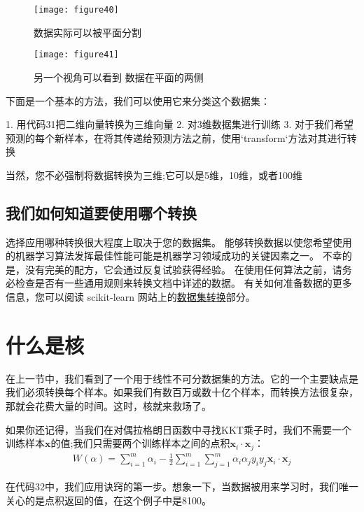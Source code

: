 \begin{figure}[ht]
	\centering
	\texttt{[image: figure40]}
	\caption{数据实际可以被平面分割}
	\label{figure40}
\end{figure}

\begin{figure}[ht]
	\centering
	\texttt{[image: figure41]}
	\caption{另一个视角可以看到 数据在平面的两侧}
	\label{figure41}
\end{figure}

下面是一个基本的方法，我们可以使用它来分类这个数据集：

1. 用代码31把二维向量转换为三维向量
2. 对3维数据集进行训练
3. 对于我们希望预测的每个新样本，在将其传递给预测方法之前，使用`transform`方法对其进行转换

当然，您不必强制将数据转换为三维;它可以是5维，10维，或者100维

\subsection{我们如何知道要使用哪个转换}

选择应用哪种转换很大程度上取决于您的数据集。 能够转换数据以使您希望使用的机器学习算法发挥最佳性能可能是机器学习领域成功的关键因素之一。 不幸的是，没有完美的配方，它会通过反复试验获得经验。 在使用任何算法之前，请务必检查是否有一些通用规则来转换文档中详述的数据。 有关如何准备数据的更多信息，您可以阅读 scikit-learn 网站上的\href{http://scikit-learn.org/stable/data_transforms.html}{数据集转换}部分。


\section{什么是核}

在上一节中，我们看到了一个用于线性不可分数据集的方法。它的一个主要缺点是我们必须转换每个样本。如果我们有数百万或数十亿个样本，而转换方法很复杂，那就会花费大量的时间。这时，核就来救场了。

如果你还记得，当我们在对偶拉格朗日函数中寻找KKT乘子时，我们不需要一个训练样本$\mathbf{x}$的值;我们只需要两个训练样本之间的点积$\mathbf{x}_i \cdot \mathbf{x}_j$：
\begin{gather*}
W(\alpha) = \sum_{i=1}^m \alpha_i - \frac{1}{2}\sum_{i=1}^m\sum_{j=1}^m \alpha_i \alpha_j y_i y_j \mathbf{x}_i \cdot \mathbf{x}_j
\end{gather*}

在代码32中，我们应用诀窍的第一步。想象一下，当数据被用来学习时，我们唯一关心的是点积返回的值，在这个例子中是8100。

